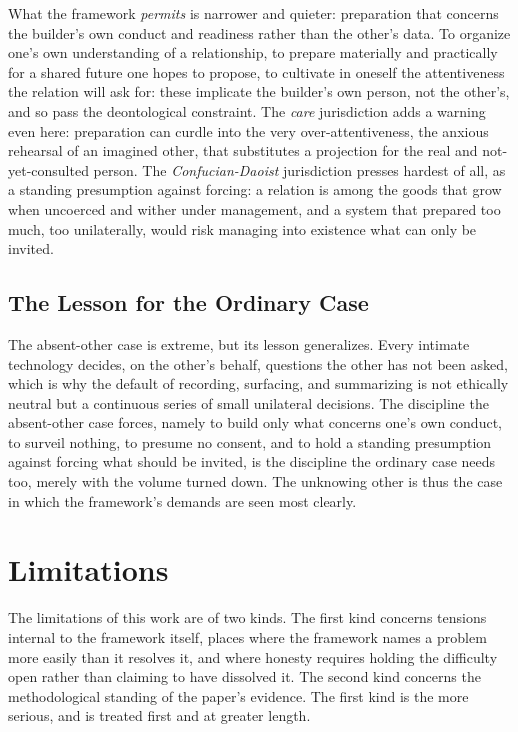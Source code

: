 \documentclass[11pt,a4paper]{article}
\begin{document}
What the framework \emph{permits} is narrower and quieter: preparation that concerns the builder's own conduct and readiness rather than the other's data. To organize one's own understanding of a relationship, to prepare materially and practically for a shared future one hopes to propose, to cultivate in oneself the attentiveness the relation will ask for: these implicate the builder's own person, not the other's, and so pass the deontological constraint. The \emph{care} jurisdiction adds a warning even here: preparation can curdle into the very over-attentiveness, the anxious rehearsal of an imagined other, that substitutes a projection for the real and not-yet-consulted person. The \emph{Confucian-Daoist} jurisdiction presses hardest of all, as a standing presumption against forcing: a relation is among the goods that grow when uncoerced and wither under management, and a system that prepared too much, too unilaterally, would risk managing into existence what can only be invited.

\subsection{The Lesson for the Ordinary Case}

The absent-other case is extreme, but its lesson generalizes. Every intimate technology decides, on the other's behalf, questions the other has not been asked, which is why the default of recording, surfacing, and summarizing is not ethically neutral but a continuous series of small unilateral decisions. The discipline the absent-other case forces, namely to build only what concerns one's own conduct, to surveil nothing, to presume no consent, and to hold a standing presumption against forcing what should be invited, is the discipline the ordinary case needs too, merely with the volume turned down. The unknowing other is thus the case in which the framework's demands are seen most clearly.

\section{Limitations}\label{p01:sec:limitations}

The limitations of this work are of two kinds. The first kind concerns tensions internal to the framework itself, places where the framework names a problem more easily than it resolves it, and where honesty requires holding the difficulty open rather than claiming to have dissolved it. The second kind concerns the methodological standing of the paper's evidence. The first kind is the more serious, and is treated first and at greater length.
\end{document}
